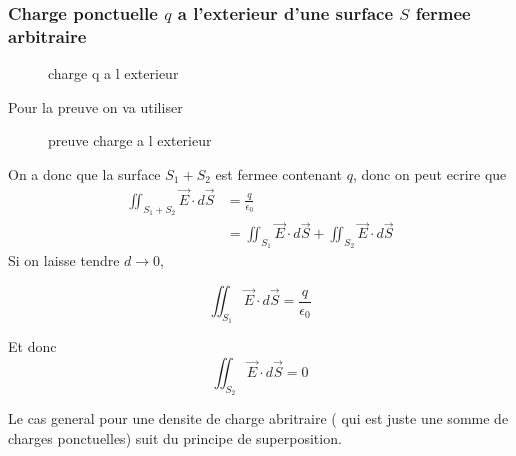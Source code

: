 \documentclass[../main.tex]{subfiles}
\begin{document}
\subsubsection*{Charge ponctuelle $q$ a l'exterieur d'une surface $S$ fermee arbitraire}
\begin{figure}[H]
    \centering
    \caption{charge q a l exterieur}
    \label{fig:charge-q-a-l-exterieur}
\end{figure}
Pour la preuve on va utiliser
\begin{figure}[H]
    \centering
    \caption{preuve charge a l exterieur}
    \label{fig:preuve-charge-a-l-exterieur}
\end{figure}
On a donc que la surface $S_1 + S_2$ est fermee contenant $q$, donc on peut ecrire que
\begin{align*}
	\iint_{S_1+S_2}  \vec{E} \cdot d \vec{S} &=  \frac{q}{\epsilon_0}\\
	&=  \iint_{S_1}  \vec{E} \cdot d \vec{S} + \iint_{S_2}  \vec{E} \cdot d \vec{S}
\end{align*}
Si on laisse tendre $d \to 0$, 

\[ 
\iint_{S_1}  \vec{E} \cdot d \vec{S} = \frac{q}{\epsilon_0}
\]

Et donc
\[ 
\iint_{S_2}  \vec{E} \cdot d \vec{S} =0
\]



Le cas general pour une densite de charge abritraire ( qui est juste une somme de charges ponctuelles) suit du principe de superposition.
\end{document}
